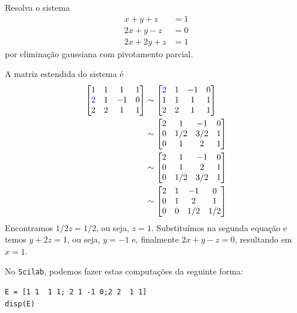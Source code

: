 \begin{ex} Resolva o sistema
\begin{equation}
  \begin{split}
    x+y+z  &= 1\\
    2x+y-z &= 0\\
    2x+2y+z &= 1
  \end{split}
\end{equation}
por eliminação gaussiana com pivotamento parcial.
\end{ex}
\begin{sol}
A matriz estendida do sistema é
\begin{equation}
  \begin{split}
    \begin{bmatrix}
      1 &1&  1&1\\
      {\color{blue}{2}} &1& -1&0\\
      2 & 2 &1&1
    \end{bmatrix}
    &\sim
    \begin{bmatrix}
      {\color{blue}{2}} &1& -1&0\\
      1 &1&  1&1\\
      2 &2&  1&1
    \end{bmatrix}\\
    &\sim
    \begin{bmatrix}
      2 &1& -1&0\\
      0 &1/2& 3/2&1\\
      0 & 1 &2&1
    \end{bmatrix}\\
    &\sim
    \begin{bmatrix}
      2 &1& -1&0\\
      0 & 1 &2&1\\
      0 &1/2& 3/2&1
    \end{bmatrix}\\
    &\sim
    \begin{bmatrix}
      2 &1& -1&0\\
      0 & 1 &2&1\\
      0 &0& 1/2&1/2
    \end{bmatrix}
  \end{split}
\end{equation}
Encontramos $1/2z=1/2$, ou seja, $z=1$. Substituímos na segunda equação e temos $y+2z=1$, ou seja, $y=-1$ e, finalmente $2x+y-z=0$, resultando em $x=1$.

\ifisscilab
No \verb+Scilab+, podemos fazer estas computações da seguinte forma:
\begin{verbatim}
E = [1 1  1 1; 2 1 -1 0;2 2  1 1]
disp(E)


\end{verbatim}
\end{sol}
